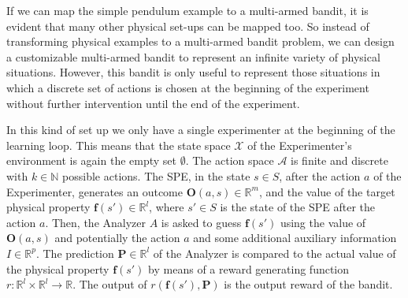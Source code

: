 \documentclass[11pt,a4paper,twoside]{report}
\newcommand{\+}{\textnormal{+} }
\theoremstyle{definition}
\numberwithin{equation}{chapter}
\begin{document}
\par If we can map the simple pendulum example to a multi-armed bandit, it is
evident that many other physical set-ups can be mapped too. So instead of
transforming physical examples to a multi-armed bandit problem, we can design a
customizable multi-armed bandit to represent an infinite variety of physical
situations. However, this bandit is only useful to represent those situations
in which a discrete set of actions is chosen at the beginning of the experiment
without further intervention until the end of the experiment.

In this kind of set up we only have a single experimenter at the beginning of
the learning loop. This means that the state space $\mathcal{X}$  of the
Experimenter's environment is again the empty set $\emptyset$. The action space
$\mathcal{A}$ is finite and discrete with $k \in \mathbb{N}$ possible actions.
The SPE, in the state $s \in S$, after the action $a$ of the Experimenter,
generates an outcome $\textbf{O}(a,s) \in \mathbb{R}^m$, and the value of the
target physical property $\textbf{f}(s') \in \mathbb{R}^l$, where $s' \in S$ is
the state of the SPE after the action $a$. Then, the Analyzer $A$ is asked to
guess $\textbf{f}(s')$ using the value of $\textbf{O}(a,s)$ and potentially the
action $a$ and some additional auxiliary information $I \in  \mathbb{R}^{p}$.
The prediction $\textbf{P} \in \mathbb{R}^l$ of the Analyzer is compared to the
actual value of the physical property $\textbf{f}(s')$ by means of a reward
generating function $r:\mathbb{R}^l\times\mathbb{R}^l\rightarrow\mathbb{R}$. The
output of $r(\textbf{f}(s'),\textbf{P})$ is the output reward of the bandit.

\end{document}

